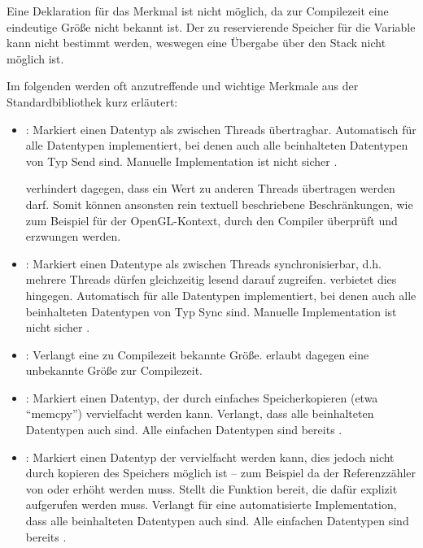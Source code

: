 Eine Deklaration  für das Merkmal  ist nicht möglich, da zur Compilezeit eine eindeutige Größe nicht bekannt ist.
Der zu reservierende Speicher für die Variable kann nicht bestimmt werden, weswegen eine Übergabe über den Stack nicht möglich ist.


Im folgenden werden oft anzutreffende und wichtige Merkmale aus der Standardbibliothek kurz erläutert:
\begin{itemize}
	\item {}: Markiert einen Datentyp als zwischen Threads übertragbar. Automatisch für alle Datentypen implementiert, bei denen auch alle beinhalteten Datentypen von Typ Send sind. Manuelle Implementation ist nicht sicher \cite{rust:book:send_sync}.
	
	 verhindert dagegen, dass ein Wert zu anderen Threads übertragen werden darf.
	Somit können ansonsten rein textuell beschriebene Beschränkungen, wie zum Beispiel für der OpenGL-Kontext, durch den Compiler überprüft und erzwungen werden.
	
	\item {}: Markiert einen Datentype als zwischen Threads synchronisierbar, d.h. mehrere Threads dürfen gleichzeitig lesend darauf zugreifen.
	 verbietet dies hingegen.
	Automatisch für alle Datentypen implementiert, bei denen auch alle beinhalteten Datentypen von Typ Sync sind. Manuelle Implementation ist nicht sicher \cite{rust:book:send_sync}.
	
	\item {}: Verlangt eine zu Compilezeit bekannte Größe.  erlaubt dagegen eine unbekannte Größe zur Compilezeit.
	
	\item {}: Markiert einen Datentyp, der durch einfaches Speicherkopieren (etwa \enquote{memcpy}) vervielfacht werden kann. Verlangt, dass alle beinhalteten Datentypen auch  sind.
	Alle einfachen Datentypen sind bereits .
	
	\item {}: Markiert einen Datentyp der vervielfacht werden kann, dies jedoch nicht durch kopieren des Speichers möglich ist -- zum Beispiel da der Referenzzähler von  oder  erhöht werden muss.
	Stellt die Funktion  bereit, die dafür explizit aufgerufen werden muss.
	Verlangt für eine automatisierte Implementation, dass alle beinhalteten Datentypen auch  sind.
	Alle einfachen Datentypen sind bereits .
	

\end{itemize}
